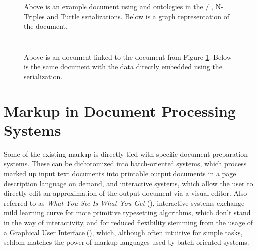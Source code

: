 \documentclass{book}
\begin{document}
        \begin{figure}
          \inputminted{xml}{examples/02/john.rd}
          \inputminted{text}{examples/02/john.nt}
          \inputminted{text}{examples/02/john.ttl}
          \caption{Above is an example  document using 
            and  ontologies in the /%
            , N-Triples and Turtle%
             serializations. Below is a graph representation
            of the document.}\label{fig:rdf-doc}\bigskip
          
        \end{figure}

        \begin{figure}[t!]
          \inputminted{html}{examples/02/john.html.linked-rdf}
          \caption{Above is an  document linked to the
             document from Figure \ref{fig:rdf-doc}. Below is the
            same  document with the  data directly
            embedded using the  serialization.}\bigskip
          \inputminted{html}{examples/02/john.html.rdfa}
        \end{figure}

        
      \section{Markup in Document Processing Systems}
        Some of the existing markup is directly tied with specific document
        preparation systems. These can be dichotomized into batch-oriented
        systems, which process marked up input text documents into printable
        output documents in a page description language on demand, and
        interactive systems, which allow the user to directly edit an
        approximation of the output document via a visual editor. Also referred
        to as \emph{What You See Is What You Get} (),
        interactive systems exchange mild learning curve for more primitive
        typesetting algorithms, which don't stand in the way of interactivity,
        and for reduced flexibility stemming from the usage of a Graphical User
        Interface (), which, although often intuitive for simple
        tasks, seldom matches the power of markup languages used by
        batch-oriented systems.
\end{document}
